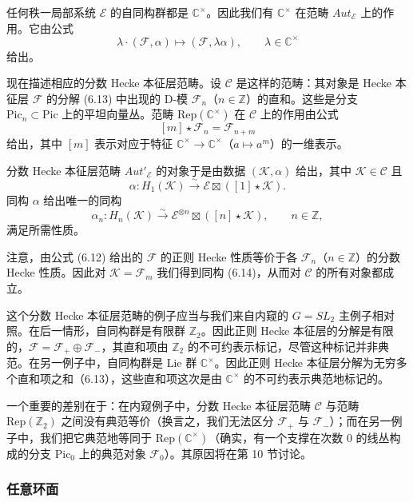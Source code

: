 任何秩一局部系统 $\mathcal{E}$ 的自同构群都是 $\mathbb{C}^\times$。因此我们有 $\mathbb{C}^\times$ 在范畴 $Aut_{\mathcal{E}}$ 上的作用。它由公式
\[
\lambda\cdot(\mathcal{F},\alpha)\mapsto(\mathcal{F},\lambda\alpha),\qquad \lambda\in\mathbb{C}^\times
\]
给出。

现在描述相应的分数 Hecke 本征层范畴。设 $\mathcal{C}$ 是这样的范畴：其对象是 Hecke 本征层 $\mathcal{F}$ 的分解 (6.13) 中出现的 D-模 $\mathcal{F}_n$（$n\in\mathbb{Z}$）的直和。这些是分支 $\mathrm{Pic}_n\subset\mathrm{Pic}$ 上的平坦向量丛。范畴 $\mathrm{Rep}(\mathbb{C}^\times)$ 在 $\mathcal{C}$ 上的作用由公式
\[
[m]\star\mathcal{F}_n = \mathcal{F}_{n+m}
\]
给出，其中 $[m]$ 表示对应于特征 $\mathbb{C}^\times\to\mathbb{C}^\times$（$a\mapsto a^m$）的一维表示。

分数 Hecke 本征层范畴 $Aut'_{\mathcal{E}}$ 的对象于是由数据 $(\mathcal{K},\alpha)$ 给出，其中 $\mathcal{K}\in\mathcal{C}$ 且
\begin{equation}\tag{6.14}
\alpha : H_1(\mathcal{K})\xrightarrow{\sim}\mathcal{E}\boxtimes([1]\star\mathcal{K}).
\end{equation}
同构 $\alpha$ 给出唯一的同构
\[
\alpha_n : H_n(\mathcal{K})\xrightarrow{\sim}\mathcal{E}^{\otimes n}\boxtimes([n]\star\mathcal{K}),\qquad n\in\mathbb{Z},
\]
满足所需性质。


注意，由公式 (6.12) 给出的 $\mathcal{F}$ 的正则 Hecke 性质等价于各 $\mathcal{F}_n$（$n\in\mathbb{Z}$）的分数 Hecke 性质。因此对 $\mathcal{K} = \mathcal{F}_m$ 我们得到同构 (6.14)，从而对 $\mathcal{C}$ 的所有对象都成立。

这个分数 Hecke 本征层范畴的例子应当与我们来自内窥的 $G = SL_2$ 主例子相对照。在后一情形，自同构群是有限群 $\mathbb{Z}_2$。因此正则 Hecke 本征层的分解是有限的，$\mathcal{F} = \mathcal{F}_+\oplus\mathcal{F}_-$，其直和项由 $\mathbb{Z}_2$ 的不可约表示标记，尽管这种标记并非典范。在另一例子中，自同构群是 Lie 群 $\mathbb{C}^\times$。因此正则 Hecke 本征层分解为无穷多个直和项之和（6.13），这些直和项这次是由 $\mathbb{C}^\times$ 的不可约表示典范地标记的。

一个重要的差别在于：在内窥例子中，分数 Hecke 本征层范畴 $\mathcal{C}$ 与范畴 $\mathrm{Rep}(\mathbb{Z}_2)$ 之间没有典范等价（换言之，我们无法区分 $\mathcal{F}_+$ 与 $\mathcal{F}_-$）；而在另一例子中，我们把它典范地等同于 $\mathrm{Rep}(\mathbb{C}^\times)$（确实，有一个支撑在次数 0 的线丛构成的分支 $\mathrm{Pic}_0$ 上的典范对象 $\mathcal{F}_0$）。其原因将在第 10 节讨论。

\subsubsection{任意环面}

